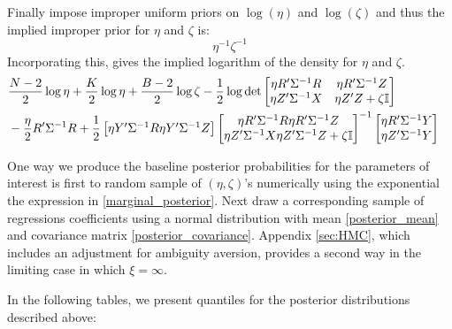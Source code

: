 \documentclass[compress]{beamer}
\begin{document}
\begin{frame}[allowframebreaks]
Finally impose improper uniform priors on $\log(\eta)$ and $\log(\zeta)$ and thus the implied  improper prior for $\eta$ and $\zeta$ is:
\[
\eta^{-1} \zeta^{-1} 
\]
Incorporating this, gives the implied logarithm of the density for $\eta$ and $\zeta.$
\begin{equation} \label{marginal_posterior}
\begin{split}
& \frac {N-2}  2 \log\eta + \frac K 2 \log\eta + \frac {B - 2}  2 \log \zeta
- {\frac 1 2} \log  \det  \begin{bmatrix} \eta R'\Sigma^{-1} R   & \eta  R' \Sigma^{-1} Z \cr \eta Z'\Sigma^{-1} X & \eta Z'Z + \zeta  {\mathbb I} \end{bmatrix} \cr
& - \frac \eta 2 R'\Sigma^{-1} R + \frac 1 2
\begin{bmatrix} \eta Y' \Sigma^{-1} R   \eta Y' \Sigma^{-1} Z \end{bmatrix}
\begin{bmatrix} \eta R'\Sigma^{-1}R    \eta  R'\Sigma^{-1} Z \cr \eta Z'\Sigma^{-1} X  \eta Z'\Sigma^{-1}Z + \zeta  {\mathbb I} \end{bmatrix}^{-1} \begin{bmatrix} \eta R'\Sigma^{-1}Y \cr  \eta Z'\Sigma^{-1} Y \end{bmatrix}
\end{split}
\end{equation}


One way we produce the baseline posterior probabilities for the parameters of interest is first to random sample of  $(\eta,\zeta)$'s  numerically using the exponential the expression in \eqref{marginal_posterior}.   Next draw a corresponding sample of regressions coefficients using a normal distribution with mean \eqref{posterior_mean} and covariance matrix \eqref{posterior_covariance}.   Appendix \ref{sec:HMC}, which includes an adjustment for ambiguity aversion, provides a second way in the limiting case in which $\xi = \infty.$







In the following tables, we present quantiles for the posterior distributions described above:

\begin{table}[H]
\caption{Quantiles for $\theta$ posterior estimation}
\vspace{-12pt}
\centering
\scalebox{1}{
\begin{threeparttable}
    
\end{threeparttable}}
\label{tab:theta_estimation}
\end{table}


\end{frame}
\end{document}

